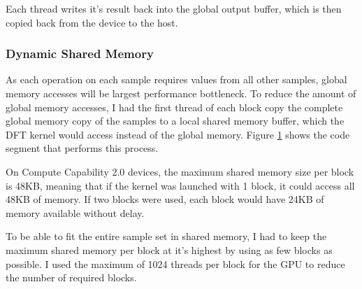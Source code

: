 \documentclass[11pt,a4paper]{article}
\begin{document}
Each thread writes it's result back into the global output buffer, which is then copied back from the device to the host.

\subsubsection{Dynamic Shared Memory} \label{sect:Dynamic Shared Memory}
As each operation on each sample requires values from all other samples, global memory accesses will be largest performance bottleneck. To reduce the amount of global memory accesses, I had the first thread of each block copy the complete global memory copy of the samples to a local shared memory buffer, which the DFT kernel would access instead of the global memory. Figure \ref{fig:code_cuda_all} shows the code segment that performs this process.

On Compute Capability 2.0 devices, the maximum shared memory size per block is 48KB, meaning that if the kernel was launched with 1 block, it could access all 48KB of memory. If two blocks were used, each block would have 24KB of memory available without delay.

\begin{figure}[H]%
    \centering
    \qquad
    \vspace{5pt}
    \caption{}
    \label{fig:code_cuda_all}%
\end{figure}

To be able to fit the entire sample set in shared memory, I had to keep the maximum shared memory per block at it's highest by using as few blocks as possible. I used the maximum of 1024 threads per block for the GPU to reduce the number of required blocks.
\end{document}
